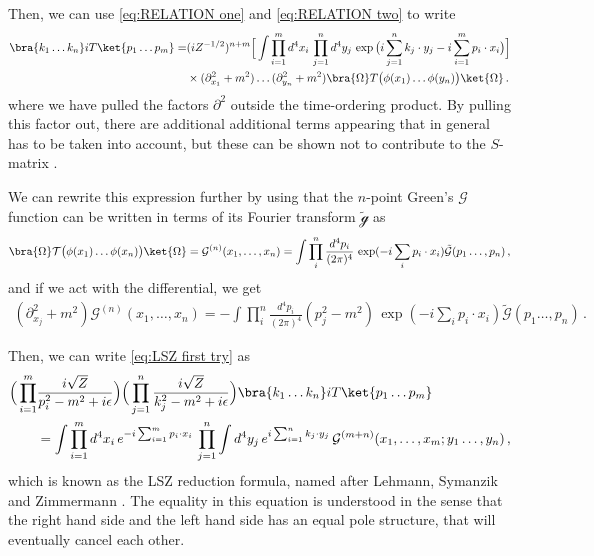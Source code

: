 Then, we can use \cref{eq:RELATION one} and \cref{eq:RELATION two} to write
\begin{align}\label{eq:LSZ first try}
    \bra{k_1\dots k_n}iT\ket{p_1\dots p_m}=&(iZ^{-1/2})^{n+m}\Big[\int\prod_{i=1}^{m} d^{4}x_{i}\,\prod_{j=1}^{n} d^{4}y_{j}\,\exp\big(i\sum_{j=1}^{n}k_{j}\cdot y_j-i\sum_{i=1}^{m}p_{i}\cdot x_i\big)\Big]\nonumber
    \\
    &\times(\partial_{x_1}^{2}+m^{2})\dots(\partial_{y_n}^{2}+m^{2})\bra{\Omega}T\big(\phi(x_1)\dots\phi(y_n)\big)\ket{\Omega}\,.
\end{align}
where we have pulled the factors $\partial^{2}$ outside the time-ordering product. By pulling this factor out, there are additional additional terms appearing that in general has to be taken into account, but these can be shown not to contribute to the $S$-matrix \cite{Maggiore:2005qv}. 

We can rewrite this expression further by using that the $n$-point Green's $\mathcal{G}$ function can be written in terms of its Fourier transform $\tilde{\mathcal{g}}$ as
\begin{align}
    \bra{\Omega}\mathcal{T}\big(\phi(x_1)\dots\phi(x_n)\big)\ket{\Omega}=\mathcal{G}^{(n)}(x_1,\dots,x_n)=\int\prod_{i}^{n}\frac{d^{4}p_{i}}{(2\pi)^{4}}\,\exp(-i\sum_ip_{i}\cdot x_i)\tilde{\mathcal{G}}(p_1\dots,p_n)\,,
\end{align}
and if we act with the differential, we get
\begin{align}
    (\partial_{x_j}^{2}+m^{2})\mathcal{G}^{(n)}(x_1,\dots,x_n)=-\int\prod_{i}^{n}\frac{d^{4}p_{i}}{(2\pi)^{4}}(p_{j}^{2}-m^{2})\,\exp(-i\sum_ip_{i}\cdot x_i)\tilde{\mathcal{G}}(p_1\dots,p_n)\,.
\end{align}

Then, we can write \cref{eq:LSZ first try} as
\begin{align}\label{eq:LSZ reduction formula}
    \Big(\prod_{i=1}^{m}&\frac{i\sqrt{Z}}{p_{i}^{2}-m^{2}+i\epsilon}\Big)\Big(\prod_{j=1}^{n}\frac{i\sqrt{Z}}{k_{j}^{2}-m^{2}+i\epsilon}\Big)\bra{k_1\dots k_n}iT\ket{p_1\dots p_m}\nonumber
    \\
    &=\int\prod_{i=1}^{m} d^{4}x_{i}\,e^{-i\sum_{i=1}^{m}p_{i}\cdot x_i}\,\prod_{j=1}^{n}\int d^{4}y_{j}\,e^{i\sum_{i=1}^{n}k_{j}\cdot y_j}\,\mathcal{G}^{(m+n)}(x_1,\dots,x_m;y_1\dots,y_n)\,,
\end{align}
which is known as the LSZ reduction formula, named after Lehmann, Symanzik and Zimmermann \cite{Lehmann:1954rq}. The equality in this equation is understood in the sense that the right hand side and the left hand side has an equal pole structure, that will eventually cancel each other.

